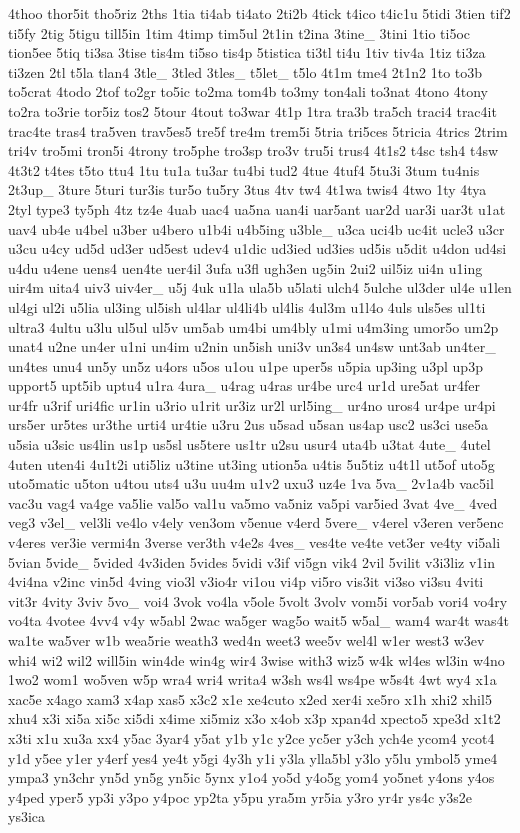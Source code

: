 \begin{DoxyCompactItemize}
4thoo thor5it tho5riz 2ths 1tia ti4ab ti4ato 2ti2b 4tick t4ico t4ic1u 5tidi 3tien tif2 ti5fy 2tig 5tigu till5in 1tim 4timp tim5ul 2t1in t2ina 3tine\-\_\- 3tini 1tio ti5oc tion5ee 5tiq ti3sa 3tise tis4m ti5so tis4p 5tistica ti3tl ti4u 1tiv tiv4a 1tiz ti3za ti3zen 2tl t5la tlan4 3tle\-\_\- 3tled 3tles\-\_\- t5let\-\_\- t5lo 4t1m tme4 2t1n2 1to to3b to5crat 4todo 2tof to2gr to5ic to2ma tom4b to3my ton4ali to3nat 4tono 4tony to2ra to3rie tor5iz tos2 5tour 4tout to3war 4t1p 1tra tra3b tra5ch traci4 trac4it trac4te tras4 tra5ven trav5es5 tre5f tre4m trem5i 5tria tri5ces 5tricia 4trics 2trim tri4v tro5mi tron5i 4trony tro5phe tro3sp tro3v tru5i trus4 4t1s2 t4sc tsh4 t4sw 4t3t2 t4tes t5to ttu4 1tu tu1a tu3ar tu4bi tud2 4tue 4tuf4 5tu3i 3tum tu4nis 2t3up\-\_\- 3ture 5turi tur3is tur5o tu5ry 3tus 4tv tw4 4t1wa twis4 4two 1ty 4tya 2tyl type3 ty5ph 4tz tz4e 4uab uac4 ua5na uan4i uar5ant uar2d uar3i uar3t u1at uav4 ub4e u4bel u3ber u4bero u1b4i u4b5ing u3ble\-\_\- u3ca uci4b uc4it ucle3 u3cr u3cu u4cy ud5d ud3er ud5est udev4 u1dic ud3ied ud3ies ud5is u5dit u4don ud4si u4du u4ene uens4 uen4te uer4il 3ufa u3fl ugh3en ug5in 2ui2 uil5iz ui4n u1ing uir4m uita4 uiv3 uiv4er\-\_\- u5j 4uk u1la ula5b u5lati ulch4 5ulche ul3der ul4e u1len ul4gi ul2i u5lia ul3ing ul5ish ul4lar ul4li4b ul4lis 4ul3m u1l4o 4uls uls5es ul1ti ultra3 4ultu u3lu ul5ul ul5v um5ab um4bi um4bly u1mi u4m3ing umor5o um2p unat4 u2ne un4er u1ni un4im u2nin un5ish uni3v un3s4 un4sw unt3ab un4ter\-\_\- un4tes unu4 un5y un5z u4ors u5os u1ou u1pe uper5s u5pia up3ing u3pl up3p upport5 upt5ib uptu4 u1ra 4ura\-\_\- u4rag u4ras ur4be urc4 ur1d ure5at ur4fer ur4fr u3rif uri4fic ur1in u3rio u1rit ur3iz ur2l url5ing\-\_\- ur4no uros4 ur4pe ur4pi urs5er ur5tes ur3the urti4 ur4tie u3ru 2us u5sad u5san us4ap usc2 us3ci use5a u5sia u3sic us4lin us1p us5sl us5tere us1tr u2su usur4 uta4b u3tat 4ute\-\_\- 4utel 4uten uten4i 4u1t2i uti5liz u3tine ut3ing ution5a u4tis 5u5tiz u4t1l ut5of uto5g uto5matic u5ton u4tou uts4 u3u uu4m u1v2 uxu3 uz4e 1va 5va\-\_\- 2v1a4b vac5il vac3u vag4 va4ge va5lie val5o val1u va5mo va5niz va5pi var5ied 3vat 4ve\-\_\- 4ved veg3 v3el\-\_\- vel3li ve4lo v4ely ven3om v5enue v4erd 5vere\-\_\- v4erel v3eren ver5enc v4eres ver3ie vermi4n 3verse ver3th v4e2s 4ves\-\_\- ves4te ve4te vet3er ve4ty vi5ali 5vian 5vide\-\_\- 5vided 4v3iden 5vides 5vidi v3if vi5gn vik4 2vil 5vilit v3i3liz v1in 4vi4na v2inc vin5d 4ving vio3l v3io4r vi1ou vi4p vi5ro vis3it vi3so vi3su 4viti vit3r 4vity 3viv 5vo\-\_\- voi4 3vok vo4la v5ole 5volt 3volv vom5i vor5ab vori4 vo4ry vo4ta 4votee 4vv4 v4y w5abl 2wac wa5ger wag5o wait5 w5al\-\_\- wam4 war4t was4t wa1te wa5ver w1b wea5rie weath3 wed4n weet3 wee5v wel4l w1er west3 w3ev whi4 wi2 wil2 will5in win4de win4g wir4 3wise with3 wiz5 w4k wl4es wl3in w4no 1wo2 wom1 wo5ven w5p wra4 wri4 writa4 w3sh ws4l ws4pe w5s4t 4wt wy4 x1a xac5e x4ago xam3 x4ap xas5 x3c2 x1e xe4cuto x2ed xer4i xe5ro x1h xhi2 xhil5 xhu4 x3i xi5a xi5c xi5di x4ime xi5miz x3o x4ob x3p xpan4d xpecto5 xpe3d x1t2 x3ti x1u xu3a xx4 y5ac 3yar4 y5at y1b y1c y2ce yc5er y3ch ych4e ycom4 ycot4 y1d y5ee y1er y4erf yes4 ye4t y5gi 4y3h y1i y3la ylla5bl y3lo y5lu ymbol5 yme4 ympa3 yn3chr yn5d yn5g yn5ic 5ynx y1o4 yo5d y4o5g yom4 yo5net y4ons y4os y4ped yper5 yp3i y3po y4poc yp2ta y5pu yra5m yr5ia y3ro yr4r ys4c y3s2e ys3ica 
\end{DoxyCompactItemize}
